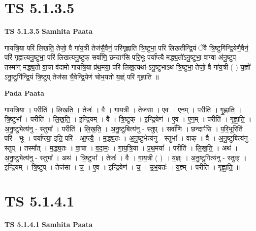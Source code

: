 \documentclass[17pt]{extarticle}
\begin{document}
\section*{ TS 5.1.3.5 }

\textbf{TS 5.1.3.5 } \newline
\textbf{Samhita Paata} \newline

गायत्रि॒या परि॑ लिखति॒ तेजो॒ वै गा॑य॒त्री तेज॑सै॒वैनं॒ परि॑गृह्णाति त्रि॒ष्टुभा॒ परि॑ लिखतीन्द्रि॒यं ॅवै त्रि॒ष्टुगि॑न्द्रि॒येणै॒वैनं॒ परि॑ गृह्णात्यनु॒ष्टुभा॒ परि॑ लिखत्यनु॒ष्टुफ् सर्वा॑णि॒ छन्दाꣳ॑सि परि॒भूः पर्या᳚प्त्यै मद्ध्य॒तो॑ऽनु॒ष्टुभा॒ वाग्वा अ॑नु॒ष्टुप् तस्मा᳚न् मद्ध्य॒तो वा॒चा व॑दामो गायत्रि॒या प्र॑थ॒मया॒ परि॑ लिख॒त्यथा॑-ऽनु॒ष्टुभाऽथ॑ त्रि॒ष्टुभा॒ तेजो॒ वै गा॑य॒त्री ( ) य॒ज्ञो॑ ऽनु॒ष्टुगि॑न्द्रि॒यं त्रि॒ष्टुप् तेज॑सा चै॒वेन्द्रि॒येण॑ चोभ॒यतो॑ य॒ज्ञ्ं परि॑ गृह्णाति ॥ \newline

\textbf{Pada Paata} \newline

गा॒य॒त्रि॒या । परीति॑ । लि॒ख॒ति॒ । तेजः॑ । वै । गा॒य॒त्री । तेज॑सा । ए॒व । ए॒न॒म् । परीति॑ । गृ॒ह्णा॒ति॒ । त्रि॒ष्टुभा᳚ । परीति॑ । लि॒ख॒ति॒ । इ॒न्द्रि॒यम् । वै । त्रि॒ष्टुक् । इ॒न्द्रि॒येण॑ । ए॒व । ए॒न॒म् । परीति॑ । गृ॒ह्णा॒ति॒ । अ॒नु॒ष्टुभेत्य॑नु - स्तुभा᳚ । परीति॑ । लि॒ख॒ति॒ । अ॒नु॒ष्टुबित्य॑नु - स्तुप् । सर्वा॑णि । छन्दाꣳ॑सि । प॒रि॒भूरिति॑ परि - भूः । पर्या᳚प्त्या॒ इति॒ परि॑ - आ॒प्त्यै॒ । म॒द्ध्य॒तः । अ॒नु॒ष्टुभेत्य॑नु - स्तुभा᳚ । वाक् । वै । अ॒नु॒ष्टुबित्य॑नु - स्तुप् । तस्मा᳚त् । म॒द्ध्य॒तः । वा॒चा । व॒दा॒मः॒ । गा॒य॒त्रि॒या । प्र॒थ॒मया᳚ । परीति॑ । लि॒ख॒ति॒ । अथ॑ । अ॒नु॒ष्टुभेत्य॑नु - स्तुभा᳚ । अथ॑ । त्रि॒ष्टुभा᳚ । तेजः॑ । वै । गा॒य॒त्री ( ) । य॒ज्ञ्ः । अ॒नु॒ष्टुगित्य॑नु - स्तुक् । इ॒न्द्रि॒यम् । त्रि॒ष्टुप् । तेज॑सा । च॒ । ए॒व । इ॒न्द्रि॒येण॑ । च॒ । उ॒भ॒यतः॑ । य॒ज्ञ्म् । परीति॑ । गृ॒ह्णा॒ति॒ ॥  \newline




\section*{ TS 5.1.4.1 }

\textbf{TS 5.1.4.1 } \newline
\textbf{Samhita Paata} \newline
\end{document}
